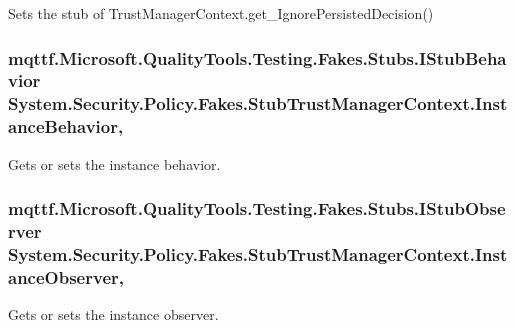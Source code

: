 Sets the stub of Trust\-Manager\-Context.\-get\-\_\-\-Ignore\-Persisted\-Decision()

\hypertarget{class_system_1_1_security_1_1_policy_1_1_fakes_1_1_stub_trust_manager_context_a6cb35320c0b14e8aff50abef026802ab}{
\subsubsection[{Instance\-Behavior}]{\setlength{\rightskip}{0pt plus 5cm}mqttf.\-Microsoft.\-Quality\-Tools.\-Testing.\-Fakes.\-Stubs.\-I\-Stub\-Behavior System.\-Security.\-Policy.\-Fakes.\-Stub\-Trust\-Manager\-Context.\-Instance\-Behavior\hspace{0.3cm}{\ttfamily [get]}, {\ttfamily [set]}}}\label{class_system_1_1_security_1_1_policy_1_1_fakes_1_1_stub_trust_manager_context_a6cb35320c0b14e8aff50abef026802ab}


Gets or sets the instance behavior.

\hypertarget{class_system_1_1_security_1_1_policy_1_1_fakes_1_1_stub_trust_manager_context_a1ecbfdf0889c57dd0f9fce8d90a65b10}{
\subsubsection[{Instance\-Observer}]{\setlength{\rightskip}{0pt plus 5cm}mqttf.\-Microsoft.\-Quality\-Tools.\-Testing.\-Fakes.\-Stubs.\-I\-Stub\-Observer System.\-Security.\-Policy.\-Fakes.\-Stub\-Trust\-Manager\-Context.\-Instance\-Observer\hspace{0.3cm}{\ttfamily [get]}, {\ttfamily [set]}}}\label{class_system_1_1_security_1_1_policy_1_1_fakes_1_1_stub_trust_manager_context_a1ecbfdf0889c57dd0f9fce8d90a65b10}


Gets or sets the instance observer.

